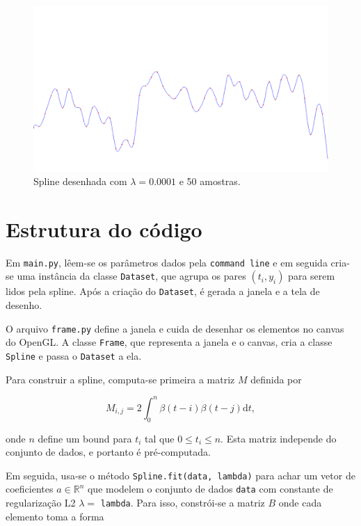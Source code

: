 \documentclass[12pt]{article}
\theoremstyle{plain}
\numberwithin{equation}{section}
\newcommand{\code}[1]{\lstinline[mathescape=true]{#1}}
\begin{document}
\begin{figure}[H]
  \centering\includegraphics[width=1.0\textwidth]{imgs/50_0-0001.png}
  \caption{Spline desenhada com $\lambda=0.0001$ e 50 amostras.\label{fig:5}}
\end{figure}

\section{Estrutura do código}

Em \code{main.py}, lêem-se os parâmetros dados pela \code{command line} e em seguida cria-se uma
instância da classe \code{Dataset}, que agrupa os pares $(t_i,y_i)$ para serem lidos pela spline.
Após a criação do \code{Dataset}, é gerada a janela e a tela de desenho.

O arquivo \code{frame.py} define a janela e cuida de desenhar os elementos no canvas do OpenGL.
A classe \code{Frame}, que representa a janela e o canvas, cria a classe \code{Spline} e passa o
\code{Dataset} a ela.

Para construir a spline, computa-se primeira a matriz $M$ definida por

\begin{equation*}
  M_{i,j}=2\int_0^n \beta(t-i)\beta(t-j)\mathrm{d}t,
\end{equation*}

onde $n$ define um bound para $t_i$ tal que $0\leq t_i\leq n$. Esta matriz independe do conjunto de
dados, e portanto é pré-computada.

Em seguida, usa-se o método \code{Spline.fit(data, lambda)} para achar um vetor de coeficientes
$a\in\mathbb{R}^n$ que modelem o conjunto de dados \code{data} com constante de regularização L2
$\lambda=$ \code{lambda}. Para isso, constrói-se a matriz $B$ onde cada elemento toma a forma
\end{document}

